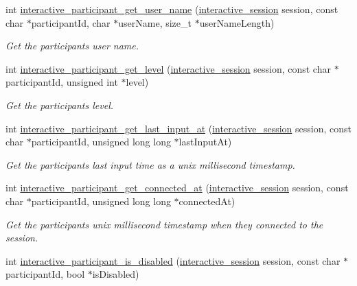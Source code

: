 \begin{DoxyCompactItemize}
int \mbox{\hyperlink{group___interactivity_gafd5b3ce5473da2a0d960aaf4463234e8}{interactive\+\_\+participant\+\_\+get\+\_\+user\+\_\+name}} (\mbox{\hyperlink{group___interactivity_ga6d8819d38b8dc8994a2299cf22a65a31}{interactive\+\_\+session}} session, const char $\ast$participant\+Id, char $\ast$user\+Name, size\+\_\+t $\ast$user\+Name\+Length)
\begin{DoxyCompactList}\small\item\em Get the participant\textquotesingle{}s user name. \end{DoxyCompactList}\item 
int \mbox{\hyperlink{group___interactivity_ga66bd07d538816cd7baaa92901c2b8f23}{interactive\+\_\+participant\+\_\+get\+\_\+level}} (\mbox{\hyperlink{group___interactivity_ga6d8819d38b8dc8994a2299cf22a65a31}{interactive\+\_\+session}} session, const char $\ast$participant\+Id, unsigned int $\ast$level)
\begin{DoxyCompactList}\small\item\em Get the participant\textquotesingle{}s level. \end{DoxyCompactList}\item 
int \mbox{\hyperlink{group___interactivity_gadd96fb7f5e463a509ad5715298088ca3}{interactive\+\_\+participant\+\_\+get\+\_\+last\+\_\+input\+\_\+at}} (\mbox{\hyperlink{group___interactivity_ga6d8819d38b8dc8994a2299cf22a65a31}{interactive\+\_\+session}} session, const char $\ast$participant\+Id, unsigned long long $\ast$last\+Input\+At)
\begin{DoxyCompactList}\small\item\em Get the participant\textquotesingle{}s last input time as a unix millisecond timestamp. \end{DoxyCompactList}\item 
int \mbox{\hyperlink{group___interactivity_gaf90a6e1366b0c439075686f1218b7d91}{interactive\+\_\+participant\+\_\+get\+\_\+connected\+\_\+at}} (\mbox{\hyperlink{group___interactivity_ga6d8819d38b8dc8994a2299cf22a65a31}{interactive\+\_\+session}} session, const char $\ast$participant\+Id, unsigned long long $\ast$connected\+At)
\begin{DoxyCompactList}\small\item\em Get the participant\textquotesingle{}s unix millisecond timestamp when they connected to the session. \end{DoxyCompactList}\item 
int \mbox{\hyperlink{group___interactivity_gab2098ae9ba695cc55849978d5a65052f}{interactive\+\_\+participant\+\_\+is\+\_\+disabled}} (\mbox{\hyperlink{group___interactivity_ga6d8819d38b8dc8994a2299cf22a65a31}{interactive\+\_\+session}} session, const char $\ast$participant\+Id, bool $\ast$is\+Disabled)

\end{DoxyCompactItemize}
